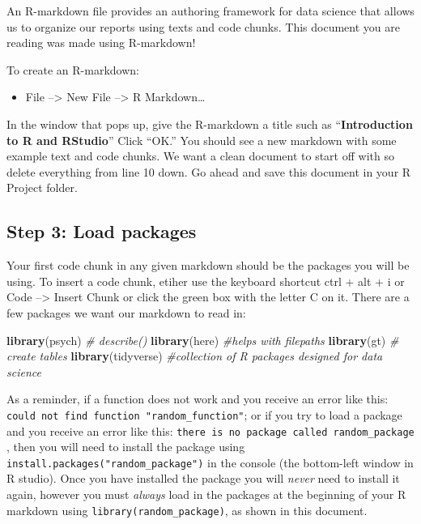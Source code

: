 \documentclass[
]{book}
\newenvironment{Shaded}{\begin{snugshade}}{\end{snugshade}}
\newcommand{\CommentTok}[1]{\textcolor[rgb]{0.56,0.35,0.01}{\textit{#1}}}
\newcommand{\FunctionTok}[1]{\textcolor[rgb]{0.13,0.29,0.53}{\textbf{#1}}}
\newcommand{\NormalTok}[1]{#1}
\providecommand{\tightlist}{%
  \setlength{\itemsep}{0pt}\setlength{\parskip}{0pt}}
\begin{document}
An R-markdown file provides an authoring framework for data science that allows us to organize our reports using texts and code chunks.
This document you are reading was made using R-markdown!

To create an R-markdown:

\begin{itemize}
\tightlist
\item
  File --\textgreater{} New File --\textgreater{} R Markdown\ldots{}
\end{itemize}

In the window that pops up, give the R-markdown a title such as ``\textbf{Introduction to R and RStudio}'' Click ``OK.'' You should see a new markdown with some example text and code chunks.
We want a clean document to start off with so delete everything from line 10 down.
Go ahead and save this document in your R Project folder.

\subsection{Step 3: Load packages}\label{step-3-load-packages}

Your first code chunk in any given markdown should be the packages you will be using.
To insert a code chunk, etiher use the keyboard shortcut ctrl + alt + i or Code --\textgreater{} Insert Chunk or click the green box with the letter C on it.
There are a few packages we want our markdown to read in:

\begin{Shaded}
\begin{Highlighting}[]
\FunctionTok{library}\NormalTok{(psych) }\CommentTok{\# describe()}
\FunctionTok{library}\NormalTok{(here) }\CommentTok{\#helps with filepaths}
\FunctionTok{library}\NormalTok{(gt) }\CommentTok{\# create tables}
\FunctionTok{library}\NormalTok{(tidyverse) }\CommentTok{\#collection of R packages designed for data science}
\end{Highlighting}
\end{Shaded}

As a reminder, if a function does not work and you receive an error like this: \texttt{could\ not\ find\ function\ "random\_function"}; or if you try to load a package and you receive an error like this: \texttt{there\ is\ no\ package\ called\ \textasciigrave{}random\_package\textasciigrave{}} , then you will need to install the package using \texttt{install.packages("random\_package")} in the console (the bottom-left window in R studio).
Once you have installed the package you will \emph{never} need to install it again, however you must \emph{always} load in the packages at the beginning of your R markdown using \texttt{library(random\_package)}, as shown in this document.
\end{document}
